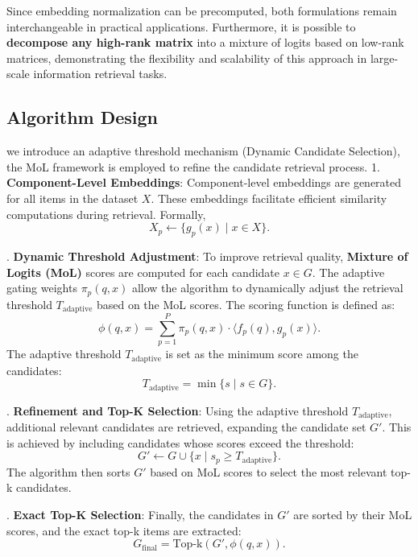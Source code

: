 Since embedding normalization can be precomputed, both formulations remain interchangeable in practical applications. Furthermore, it is possible to \textbf{decompose any high-rank matrix} into a mixture of logits based on low-rank matrices, demonstrating the flexibility and scalability of this approach in large-scale information retrieval tasks.
\subsection{Algorithm Design}

we introduce an adaptive threshold mechanism
(Dynamic Candidate Selection), the MoL framework is employed to refine the
candidate retrieval process. 
1. \textbf{Component-Level Embeddings}:  
Component-level embeddings are generated for all items in the dataset \(X\). These embeddings facilitate efficient similarity computations during retrieval. Formally,
\begin{equation}
	X_p \leftarrow \{g_p(x) \mid x \in X\}.
\end{equation}

. \textbf{Dynamic Threshold Adjustment}:  
To improve retrieval quality, \textbf{Mixture of Logits (MoL)} scores are computed for each candidate \(x \in G\). The adaptive gating weights \(\pi_p(q, x)\) allow the algorithm to dynamically adjust the retrieval threshold \(T_{\text{adaptive}}\) based on the MoL scores. The scoring function is defined as:
\begin{equation}
	\phi(q, x) = \sum_{p=1}^{P} \pi_p(q, x) \cdot \langle f_p(q), g_p(x) \rangle.
\end{equation}
The adaptive threshold \(T_{\text{adaptive}}\) is set as the minimum score among the candidates:
\begin{equation}
	T_{\text{adaptive}} = \min\{s \mid s \in G\}.
\end{equation}

. \textbf{Refinement and Top-K Selection}:  
Using the adaptive threshold \(T_{\text{adaptive}}\), additional relevant candidates are retrieved, expanding the candidate set \(G'\). This is achieved by including candidates whose scores exceed the threshold:
\begin{equation}
	G' \leftarrow G \cup \{x \mid s_p \geq T_{\text{adaptive}}\}.
\end{equation}
The algorithm then sorts \(G'\) based on MoL scores to select the most relevant top-k candidates.

. \textbf{Exact Top-K Selection}:  
Finally, the candidates in \(G'\) are sorted by their MoL scores, and the exact top-k items are extracted:
\begin{equation}
	G_{\text{final}} = \text{Top-k}(G', \phi(q, x)).
\end{equation}

